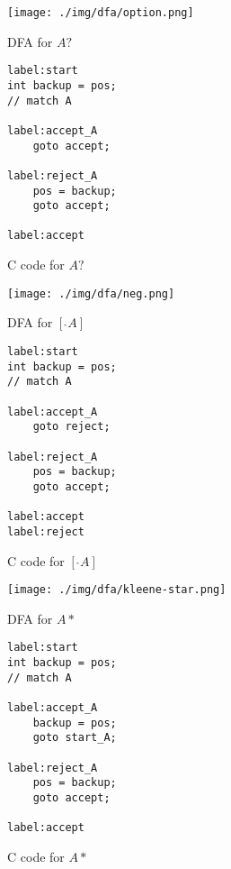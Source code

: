 \documentclass[11pt,a4paper]{report}
\newcommand{\regexp}[1]{$#1$}
\begin{document}
\begin{figure}[h!]
	\begin{subfigure}[h]{0.45\textwidth}
		\centering
		\texttt{[image: ./img/dfa/option.png]}
		\caption{DFA for \regexp{A?}}
	\end{subfigure}
	\hspace{0.05\textwidth}
	\begin{subfigure}[h]{0.45\textwidth}
		\centering
		\begin{lstlisting}[style=C]
label:start
int backup = pos;
// match A

label:accept_A
	goto accept;

label:reject_A
	pos = backup;
	goto accept;

label:accept
		\end{lstlisting}
		\caption{C code for \regexp{A?}}
	\end{subfigure}
	\caption{}
\end{figure}

\begin{figure}[h!]
	\begin{subfigure}[h]{0.45\textwidth}
		\centering
		\texttt{[image: ./img/dfa/neg.png]}
		\caption{DFA for \regexp{[\ \hat{} A]}}
	\end{subfigure}
	\hspace{0.05\textwidth}
	\begin{subfigure}[h]{0.45\textwidth}
		\centering
		\begin{lstlisting}[style=C]
label:start
int backup = pos;
// match A

label:accept_A
	goto reject;

label:reject_A
	pos = backup;
	goto accept;

label:accept
label:reject
		\end{lstlisting}
		\caption{C code for \regexp{[\ \hat{} A]}}
	\end{subfigure}
	\caption{}
\end{figure}

\begin{figure}[h!]
	\begin{subfigure}[h]{0.45\textwidth}
		\centering
		\texttt{[image: ./img/dfa/kleene-star.png]}
		\caption{DFA for \regexp{A*}}
	\end{subfigure}
	\hspace{0.05\textwidth}
	\begin{subfigure}[h]{0.45\textwidth}
		\centering
		\begin{lstlisting}[style=C]
label:start
int backup = pos;
// match A

label:accept_A
	backup = pos;
	goto start_A;

label:reject_A
	pos = backup;
	goto accept;

label:accept
		\end{lstlisting}
		\caption{C code for \regexp{A*}}
	\end{subfigure}
	\caption{}
\end{figure}
\end{document}
